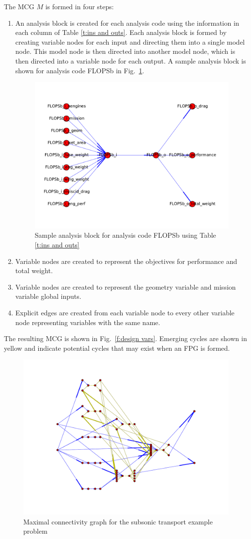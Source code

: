 The MCG $M$ is formed in four steps:
\begin{enumerate}
\item An analysis block is created for each analysis code using the information in each column of Table \ref{t:ins and outs}. Each analysis block is formed by creating variable nodes for each input and directing them into a single model node. This model node is then directed into another model node, which is then directed into a variable node for each output. A sample analysis block is shown for analysis code FLOPSb in Fig.~\ref{f:FLOPSb analysis block}.
\begin{figure}[htb!]
  \begin{center}
    \includegraphics[width=.6\textwidth]{images/FLOPSb_analysis_block}
  \end{center}
  \caption{Sample analysis block for analysis code FLOPSb using Table \ref{t:ins and outs}}
\label{f:FLOPSb analysis block}
\end{figure}

\item Variable nodes are created to represent the objectives for performance and total weight.

\item Variable nodes are created to represent the geometry variable and mission variable global inputs.

\item Explicit edges are created from each variable node to every other variable node representing variables with the same name.
\end{enumerate}
The resulting MCG is shown in Fig.~\ref{f:design vars}. Emerging cycles are shown in yellow and indicate potential cycles that may exist when an FPG is formed.
\begin{figure}[htb!]
  \begin{center}
    \includegraphics[width=.6\textwidth]{images/MCG}
  \end{center}
  \caption{Maximal connectivity graph for the subsonic transport example problem}
\end{figure}


